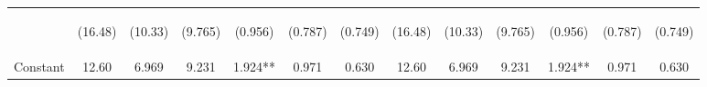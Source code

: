 \documentclass[]{article}
\begin{document}
\begin{center}
\begin{tabular}{lcccccccccccc}
\vspace{4pt} & \begin{footnotesize}(16.48)\end{footnotesize} & \begin{footnotesize}(10.33)\end{footnotesize} & \begin{footnotesize}(9.765)\end{footnotesize} & \begin{footnotesize}(0.956)\end{footnotesize} & \begin{footnotesize}(0.787)\end{footnotesize} & \begin{footnotesize}(0.749)\end{footnotesize} & \begin{footnotesize}(16.48)\end{footnotesize} & \begin{footnotesize}(10.33)\end{footnotesize} & \begin{footnotesize}(9.765)\end{footnotesize} & \begin{footnotesize}(0.956)\end{footnotesize} & \begin{footnotesize}(0.787)\end{footnotesize} & \begin{footnotesize}(0.749)\end{footnotesize} \\
Constant & 12.60 & 6.969 & 9.231 & 1.924** & 0.971 & 0.630 & 12.60 & 6.969 & 9.231 & 1.924** & 0.971 & 0.630 \\

\end{tabular}
\end{center}
\end{document}
